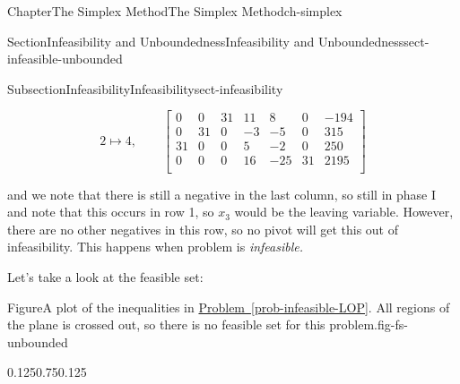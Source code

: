 \documentclass[oneside,10pt,]{book}
\newcommand{\xreffont}{\relax}
\numberwithin{equation}{section}
\newcommand{\amp}{&}
\begin{document}
\begin{chapterptx}{Chapter}{The Simplex Method}{}{The Simplex Method}{}{}{ch-simplex}
\begin{sectionptx}{Section}{Infeasibility and Unboundedness}{}{Infeasibility and Unboundedness}{}{}{sect-infeasible-unbounded}
\begin{subsectionptx}{Subsection}{Infeasibility}{}{Infeasibility}{}{}{sect-infeasibility}
\par
%
\begin{equation*}
2 \mapsto 4, \qquad \left[\begin{array}{rr|rrrr|r} 0 \amp 0 \amp 31 \amp 11 \amp 8 \amp 0 \amp -194\\ 0 \amp 31 \amp 0 \amp -3 \amp -5 \amp 0 \amp 315\\ 31 \amp 0 \amp 0 \amp 5 \amp -2 \amp 0 \amp 250\\ \hline 0 \amp 0 \amp 0 \amp 16 \amp -25 \amp 31 \amp 2195\\ \end{array} \right]
\end{equation*}
%
\par
and we note that there is still a negative in the last column, so still in phase I and note that this occurs in row 1, so \(x_3\) would be the leaving variable. However, there are no other negatives in this row, so no pivot will get this out of infeasibility. This happens when problem is \emph{infeasible.}%
\par
Let's take a look at the feasible set:%
\begin{figureptx}{Figure}{A plot of the inequalities in \hyperref[prob-infeasible-LOP]{Problem~{\xreffont\ref{prob-infeasible-LOP}}}. All regions of the plane is crossed out, so there is no feasible set for this problem.}{fig-fs-unbounded}{}%
\begin{image}{0.125}{0.75}{0.125}{}%
\end{image}
\end{figureptx}
\end{subsectionptx}
\end{sectionptx}
\end{chapterptx}
\end{document}
